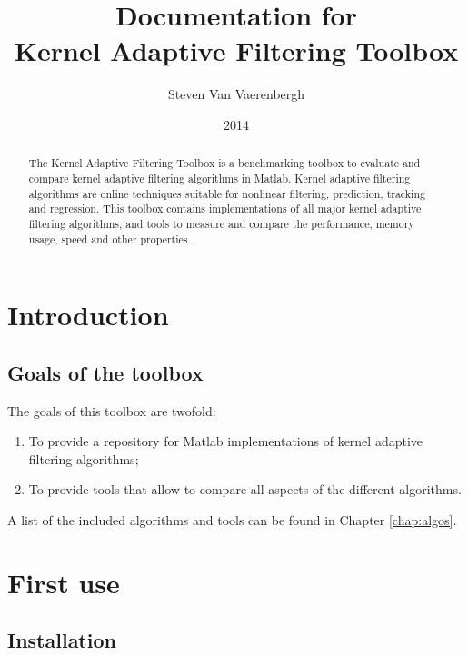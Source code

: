 \documentclass[]{report}
\begin{document}
\title{Documentation for \\Kernel Adaptive Filtering Toolbox}
\author{Steven Van Vaerenbergh}
\date{2014}
\maketitle

\begin{abstract}
The Kernel Adaptive Filtering Toolbox is a benchmarking toolbox to evaluate and compare kernel adaptive filtering algorithms in Matlab. Kernel adaptive filtering algorithms are online techniques suitable for nonlinear filtering, prediction, tracking and regression. This toolbox contains implementations of all major kernel adaptive filtering algorithms, and tools to measure and compare the performance, memory usage, speed and other properties.
\end{abstract}


\tableofcontents

\chapter{Introduction}


\section{Goals of the toolbox}
The goals of this toolbox are twofold:
\begin{enumerate}
\item To provide a repository for Matlab implementations of kernel adaptive filtering algorithms;
\item To provide tools that allow to compare all aspects of the different algorithms.
\end{enumerate}
A list of the included algorithms and tools can be found in Chapter \ref{chap:algos}.


\chapter{First use}

\section{Installation}
\end{document}
